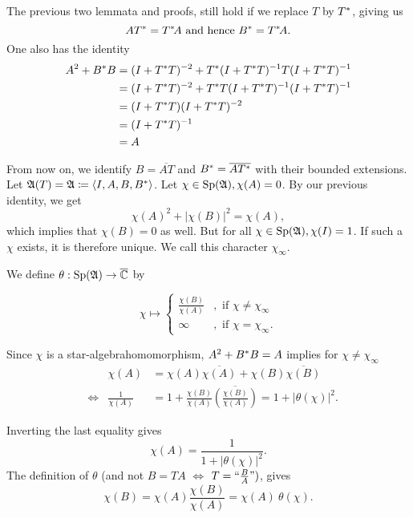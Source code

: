 \begin{rem}
 The previous two lemmata and proofs, still hold if we replace $T$ by $T^{*}$,
 giving us 
 \[
  AT^{*} = T^{*} \! A \text{ and hence } B^{*} = T^{*} \! A.
 \]
 One also has the identity
 \begin{align*}
  A^2 + B^{*} B &= (I + T^{*} T)^{-2} + T ^{*} (I + T^{*} T)
		    ^{-1} T (I + T^{*} T) ^{-1} \\
		&= (I + T^{*} T)^{-2} + T ^{*} T(I + T^{*} T)
		   ^{-1} (I + T^{*} T) ^{-1} \\
		&= (I + T^{*} T)(I + T^{*} T)^{-2} \\
		&= (I + T^{*} T)^{-1}  \\
		&= A 
  \end{align*}

  

\end{rem}

From now on, we identify $B=\overline{AT}$ and $B^{*} =\overline{AT^{*}}$
with their bounded extensions.
Let $\mathfrak{A} (T) = \mathfrak{A} \coloneqq \left\langle I, A, B , B^{*} \right\rangle$. Let $ \chi \in \operatorname{Sp} (\mathfrak{A})
, \chi(A) =0$. By our previous identity, we get
\[
 \chi(A)^2 + |\chi(B)|^2 = \chi(A),
\]
which implies that $\chi(B) =0$ as well. But for all $\chi \in \operatorname{Sp} (\mathfrak{A}), 
\chi(I)=1$. If such a $\chi$ exists, it is therefore unique. We call this
character $\chi_\infty$.

We define $\theta : \operatorname{Sp} (\mathfrak{A}) \to {\overline{\mathbb{C}}}$ by

 \[
 \chi \mapsto 
  \begin{cases}
    \frac{\chi(B)}{\chi(A)} &, \text{ if }\chi \neq \chi_\infty\\
    \infty &, \text{ if } \chi = \chi_\infty.
    \end{cases}
 \]
 
 Since $\chi$ is a star-algebrahomomorphism, $A^2 + B^{*} B = A$ implies for
 $\chi \neq \chi_\infty$
 \begin{align*}
  &  & \chi(A) &= \chi(A) \overline{\chi(A)} + \chi(B) \overline{\chi(B)} \\
  &\Leftrightarrow& \frac{1}{\chi(A)} &= 1 + \frac{\chi(B)}{\chi(A)} 
  \overline{\left( \frac{\chi(B)}{\chi(A)} \right)} = 1 + | \theta(\chi)|^2. 
 \end{align*}
 


Inverting the last equality gives
\[
 \chi(A) = \frac{1}{1 + |\theta (\chi)|^2} \tag{$\ast$}.
\]
The definition of $\theta$ (and not $B= TA$ $\Leftrightarrow$ $T = 
`` \frac{B}{A} ")$, gives
\[
 \chi(B) = \chi(A) \frac{\chi(B)}{\chi(A)}= \chi(A)~ \theta(\chi) 
 \tag{$\ast \ast$}.
\]

